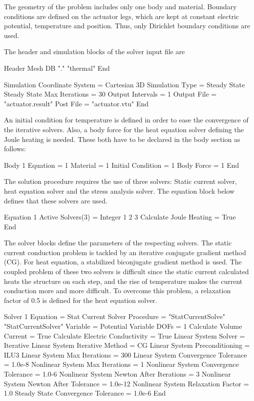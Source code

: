 The geometry of the problem includes only one body and
material. Boundary conditions are defined on the actuator legs, which
are kept at constant electric potential, temperature and
position. Thus, only Dirichlet boundary conditions are used.

The header and simulation blocks of the solver input file are

\ttbegin
Header
  Mesh DB "." "thermal"
End

Simulation
  Coordinate System = Cartesian 3D
  Simulation Type = Steady State
  Steady State Max Iterations = 30
  Output Intervals = 1
  Output File = "actuator.result"
  Post File = "actuator.vtu"
End
\ttend

An initial condition for temperature is defined in order to ease the
convergence of the iterative solvers. Also, a body force for the
heat equation solver defining the Joule heating is needed. These
both have to be declared in the body section as follows:

\ttbegin
Body 1
  Equation = 1
  Material = 1
  Initial Condition = 1
  Body Force = 1
End
\ttend

The solution procedure requires the use of three solvers: Static
current solver, heat equation solver and the stress analysis
solver. The equation block below defines that these solvers are
used. 

\ttbegin
Equation 1
  Active Solvers(3) = Integer 1 2 3
  Calculate Joule Heating = True
End
\ttend

The solver blocks define the parameters of the respecting solvers. The
static current conduction problem is tackled by an iterative conjugate
gradient method (CG). For heat equation, a stabilized biconjugate
gradient method is used. The coupled problem of these two solvers is
difficult since the static current calculated heats the structure on
each step, and the rise of temperature makes the current conduction
more and more difficult. To overcome this problem, a relaxation factor
of 0.5 is defined for the heat equation solver.

\ttbegin
Solver 1
  Equation = Stat Current Solver
  Procedure = "StatCurrentSolve" "StatCurrentSolver"
  Variable = Potential
  Variable DOFs = 1
  Calculate Volume Current = True
  Calculate Electric Conductivity = True
  Linear System Solver = Iterative
  Linear System Iterative Method = CG
  Linear System Preconditioning = ILU3
  Linear System Max Iterations = 300
  Linear System Convergence Tolerance = 1.0e-8
  Nonlinear System Max Iterations = 1
  Nonlinear System Convergence Tolerance = 1.0-6
  Nonlinear System Newton After Iterations = 3
  Nonlinear System Newton After Tolerance = 1.0e-12
  Nonlinear System Relaxation Factor = 1.0
  Steady State Convergence Tolerance = 1.0e-6
End


